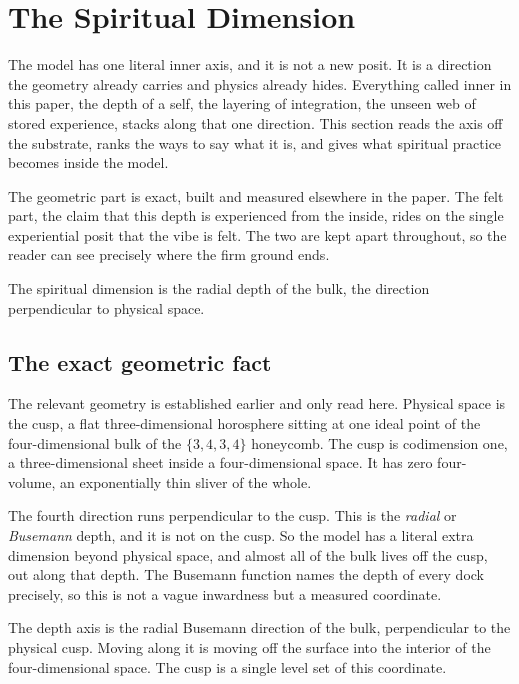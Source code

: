 \section{The Spiritual Dimension}

The model has one literal inner axis, and it is not a new posit. It is a direction the geometry already carries and physics already hides. Everything called inner in this paper, the depth of a self, the layering of integration, the unseen web of stored experience, stacks along that one direction. This section reads the axis off the substrate, ranks the ways to say what it is, and gives what spiritual practice becomes inside the model.

The geometric part is exact, built and measured elsewhere in the paper. The felt part, the claim that this depth is experienced from the inside, rides on the single experiential posit that the vibe is felt. The two are kept apart throughout, so the reader can see precisely where the firm ground ends.

\begin{principle}
The spiritual dimension is the radial depth of the bulk, the direction perpendicular to physical space.
\end{principle}

\subsection{The exact geometric fact}

The relevant geometry is established earlier and only read here. Physical space is the cusp, a flat three-dimensional horosphere sitting at one ideal point of the four-dimensional bulk of the $\{3,4,3,4\}$ honeycomb. The cusp is codimension one, a three-dimensional sheet inside a four-dimensional space. It has zero four-volume, an exponentially thin sliver of the whole.

The fourth direction runs perpendicular to the cusp. This is the \emph{radial} or \emph{Busemann} depth, and it is not on the cusp. So the model has a literal extra dimension beyond physical space, and almost all of the bulk lives off the cusp, out along that depth. The Busemann function names the depth of every dock precisely, so this is not a vague inwardness but a measured coordinate.

\begin{definition}
The depth axis is the radial Busemann direction of the bulk, perpendicular to the physical cusp. Moving along it is moving off the surface into the interior of the four-dimensional space. The cusp is a single level set of this coordinate.
\end{definition}

